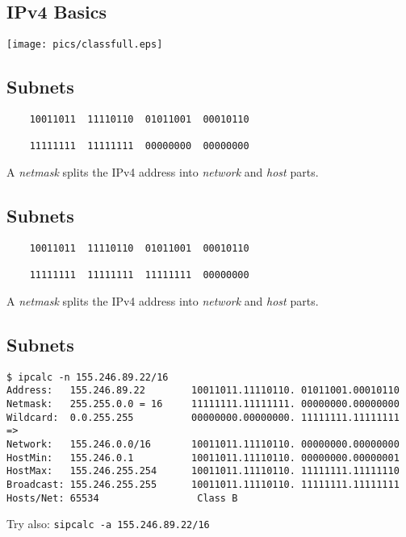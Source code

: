 \documentclass[xga]{xdvislides}
\begin{document}
\subsection{IPv4 Basics}
\vspace*{\fill}
\begin{center}
	\texttt{[image: pics/classfull.eps]}
\end{center}
\vspace*{\fill}

\subsection{Subnets}
\vspace{.5in}
\Hugesize
\begin{center}
\begin{verbatim}
    10011011  11110110  01011001  00010110

    11111111  11111111  00000000  00000000
\end{verbatim}
\vspace{.5in}
A {\em netmask} splits the IPv4 address into {\em network} and {\em host}
parts.
\end{center}
\Normalsize

\subsection{Subnets}
\vspace{.5in}
\Hugesize
\begin{center}
\begin{verbatim}
    10011011  11110110  01011001  00010110

    11111111  11111111  11111111  00000000
\end{verbatim}
\vspace{.5in}
A {\em netmask} splits the IPv4 address into {\em network} and {\em host}
parts.
\end{center}
\Normalsize

\subsection{Subnets}
\begin{verbatim}
$ ipcalc -n 155.246.89.22/16
Address:   155.246.89.22        10011011.11110110. 01011001.00010110
Netmask:   255.255.0.0 = 16     11111111.11111111. 00000000.00000000
Wildcard:  0.0.255.255          00000000.00000000. 11111111.11111111
=>
Network:   155.246.0.0/16       10011011.11110110. 00000000.00000000
HostMin:   155.246.0.1          10011011.11110110. 00000000.00000001
HostMax:   155.246.255.254      10011011.11110110. 11111111.11111110
Broadcast: 155.246.255.255      10011011.11110110. 11111111.11111111
Hosts/Net: 65534                 Class B
\end{verbatim}
\vspace{.5in}
Try also: \verb+sipcalc -a 155.246.89.22/16+
\end{document}
